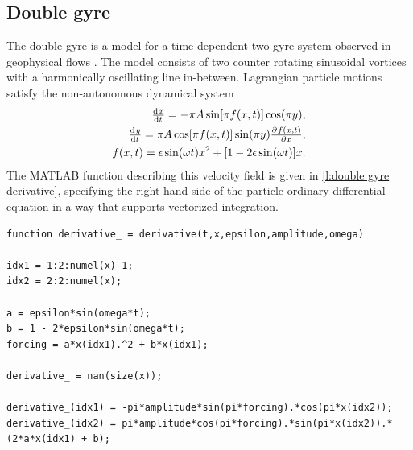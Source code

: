 \documentclass{elsarticle}
\begin{document}
\subsection{Double gyre}
The double gyre is a model for a time-dependent two gyre system observed in geophysical flows \citep{shadden05:_defin_lagran_lyapun}. The model consists of two counter rotating sinusoidal vortices with a harmonically oscillating line in-between. Lagrangian particle motions satisfy the non-autonomous dynamical system
\begin{equation}
\begin{split}
\od{x}{t} = -\pi A \sin[\pi f(x,t)] \cos(\pi y),\\
\od{y}{t} = \pi A \cos[\pi f(x,t)] \sin(\pi y) \pd{f(x,t)}{x},\\
f(x,t) = \epsilon \sin(\omega t) x^2 + [1 - 2 \epsilon \sin(\omega t)] x.
\end{split}
\label{eq:double gyre derivative equations}
\end{equation}
The MATLAB function describing this velocity field is given in \cref{l:double gyre derivative}, specifying the right hand side of the particle ordinary differential equation in a way that supports vectorized integration.

\begin{lstlisting}[caption={Double gyre derivative function corresponding to \cref{eq:double gyre derivative equations}.},label=l:double gyre derivative]
function derivative_ = derivative(t,x,epsilon,amplitude,omega)

idx1 = 1:2:numel(x)-1;
idx2 = 2:2:numel(x);

a = epsilon*sin(omega*t);
b = 1 - 2*epsilon*sin(omega*t);
forcing = a*x(idx1).^2 + b*x(idx1);

derivative_ = nan(size(x));

derivative_(idx1) = -pi*amplitude*sin(pi*forcing).*cos(pi*x(idx2));
derivative_(idx2) = pi*amplitude*cos(pi*forcing).*sin(pi*x(idx2)).*(2*a*x(idx1) + b);
\end{lstlisting}
\end{document}
